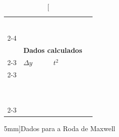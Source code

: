 \begin{table}[!ht]
\begin{tabular}{lp{25mm}p{25mm}p{25mm}l}
        & \cellcolor[gray]{0.89} & \cellcolor[gray]{0.92} & \cellcolor[gray]{0.89} \\
        & \cellcolor[gray]{0.95} & \cellcolor[gray]{0.97} & \cellcolor[gray]{0.95} \\
        & \cellcolor[gray]{0.89} & \cellcolor[gray]{0.92} & \cellcolor[gray]{0.89} \\
        & \cellcolor[gray]{0.95} & \cellcolor[gray]{0.97} & \cellcolor[gray]{0.95} \\
        & \cellcolor[gray]{0.89} & \cellcolor[gray]{0.92} & \cellcolor[gray]{0.89} \\
        & \cellcolor[gray]{0.95} & \cellcolor[gray]{0.97} & \cellcolor[gray]{0.95} \\
        \cmidrule{2-4}
    \\
        & \multicolumn{3}{l}{\textbf{Dados calculados}} \\
        \cmidrule{2-3}
        & $\Delta y$ & $t^2$ \\
        \cmidrule{2-3}
        & \cellcolor[gray]{0.89} & \cellcolor[gray]{0.92} \\ 
        & \cellcolor[gray]{0.95} & \cellcolor[gray]{0.97} \\ 
        & \cellcolor[gray]{0.89} & \cellcolor[gray]{0.92} \\ 
        & \cellcolor[gray]{0.95} & \cellcolor[gray]{0.97} \\ 
        & \cellcolor[gray]{0.89} & \cellcolor[gray]{0.92} \\ 
        & \cellcolor[gray]{0.95} & \cellcolor[gray]{0.97} \\ 
        & \cellcolor[gray]{0.89} & \cellcolor[gray]{0.92} \\ 
        & \cellcolor[gray]{0.95} & \cellcolor[gray]{0.97} \\ 
        & \cellcolor[gray]{0.89} & \cellcolor[gray]{0.92} \\ 
        & \cellcolor[gray]{0.95} & \cellcolor[gray]{0.97} \\ 
        \cmidrule{2-3}
    \bottomrule
    \end{tabular}
    \caption[][5mm]{Dados para a Roda de Maxwell}
    \label{DadosRodaDeMaxwell}
    \end{table}
